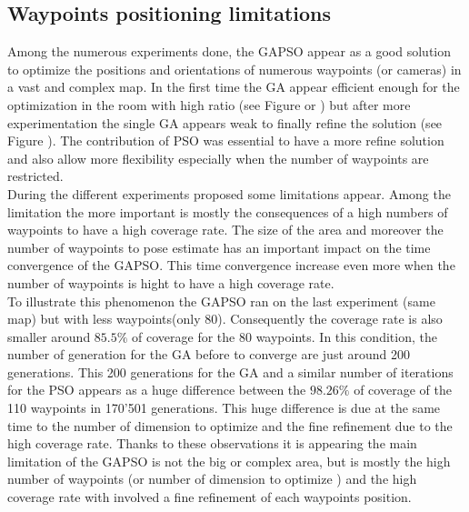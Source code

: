 	\subsection{Waypoints positioning limitations} \label{sec:waypointPoseLimite}
	
Among the numerous experiments done, the GAPSO appear as a good solution to optimize the positions and orientations of numerous waypoints (or cameras) in a vast and complex map.
In the first time the GA appear efficient enough for the optimization in the room with high ratio (see Figure  or ) but after more experimentation the single GA appears weak to finally refine the solution (see Figure ). The contribution of PSO was essential to have a more refine solution and also allow more flexibility especially when the number of waypoints are restricted. \\
During the different experiments proposed some limitations appear. Among the limitation the more important is mostly the consequences of a high numbers of waypoints to have a high coverage rate.
 The size of the area and moreover the number of waypoints to pose estimate has an important impact on the time convergence of the GAPSO.  This time convergence increase even more when the number of waypoints is hight to have a high coverage rate. \\
 To illustrate this phenomenon the GAPSO ran on the last experiment (same map) but  with less waypoints(only 80). Consequently the coverage rate is also smaller around $85.5\%$ of coverage for  the 80 waypoints. In this condition, the number of generation for the GA before to converge are just around 200 generations.  This 200 generations for the GA and a similar number of iterations for the PSO appears as a huge difference between the $98.26\%$ of coverage of the 110 waypoints in 170'501 generations. This huge difference is due at the same time to the number of dimension to optimize and the fine refinement due to the high coverage rate.
 Thanks to these observations it is appearing the main limitation of the GAPSO is not the  big or complex area, but is mostly the high number of waypoints (or number of dimension to optimize ) and the high coverage rate with involved a fine refinement of each waypoints position. 
 



